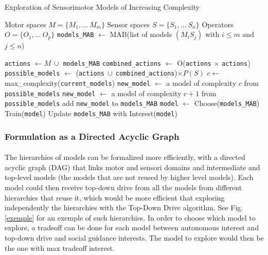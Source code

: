 \documentclass[12pt]{article}
\begin{document}
			
			\begin{algorithm}[H]
				\caption{Exploration of Sensorimotor Models of Increasing Complexity}
				\label{algomult}
				\begin{algorithmic}[1]
					\Require Motor spaces $M = \{M_1, ...~ M_m\}$
					\Require Sensor spaces $S = \{S_1, ...~ S_n\}$
					\Require Operators $O = \{O_1, ...~ O_p\}$
					\State \texttt{models\_MAB} $\gets$ MAB(list of models $(M_iS_j)$ with $i \leq m$ and $j \leq n$)~~~
					\Loop
							
							\State \texttt{actions} $\gets M~\cup $ \texttt{models\_MAB}
							\State \texttt{combined\_actions} $\gets$ O(\texttt{actions} $\times$ \texttt{actions})
							\State \texttt{possible\_models} $\gets$ (\texttt{actions}$ ~\cup~ $\texttt{combined\_actions})$ \times P(S)$
							\State $c \gets$ max\_complexity(\texttt{current\_models})
								\State \texttt{new\_model} $\gets$ a model of complexity $c$ from \texttt{possible\_models}
							\Else
								\State \texttt{new\_model} $\gets$ a model of complexity $c+1$ from \texttt{possible\_models}
							\EndIf
							\State add \texttt{new\_model} to \texttt{models\_MAB}
						\Else
							\State \texttt{model} $\gets$ Choose(\texttt{models\_MAB})
							\State Train(\texttt{model})
							\State Update \texttt{models\_MAB} with Interest(\texttt{model})
						\EndIf
					\EndLoop
				\end{algorithmic}
			\end{algorithm}

		
		\subsubsection{Formulation as a Directed Acyclic Graph}
		\label{sec:dag}
		
			\paragraph{}
			The hierarchies of models can be formalized more efficiently, with a directed acyclic graph (DAG) that links motor and sensori domains and
			intermediate and top-level models (the models that are not reused by higher level models).
			Each model could then receive top-down drive from all the models from different hierarchies that reuse it, which would be more efficient that exploring independently the 
			hierarchies with the Top-Down Drive algorithm. See Fig. \ref{exemple} for an exemple of such hierarchies.
			In order to choose which model to explore, a tradeoff can be done for each model between autonomous interest and top-down drive and social guidance interests.
			The model to explore would then be the one with max tradeoff interest.
			
\end{document}
